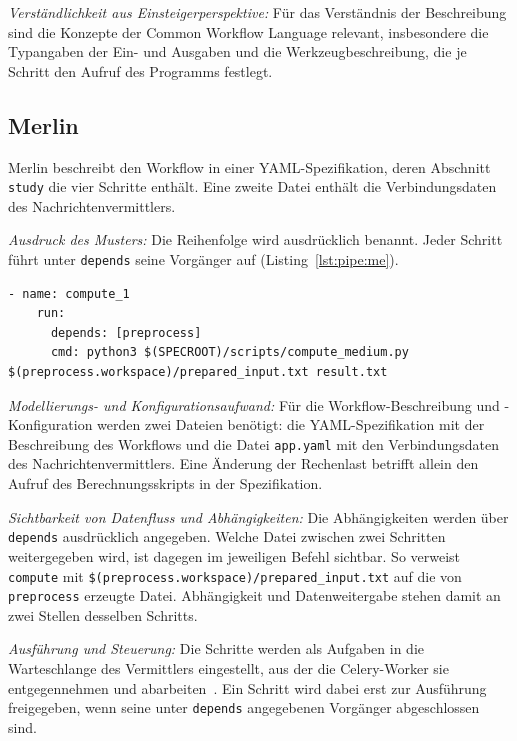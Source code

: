 \emph{Verständlichkeit aus Einsteigerperspektive:} Für das
Verständnis der Beschreibung sind die Konzepte der Common Workflow
Language relevant, insbesondere die Typangaben der Ein- und
Ausgaben und die Werkzeugbeschreibung, die je Schritt den Aufruf
des Programms festlegt.

\subsection{Merlin}
\label{sec:lokal:pipeline:merlin}

Merlin beschreibt den Workflow in einer YAML-Spezifikation, deren
Abschnitt \texttt{study} die vier Schritte enthält. Eine zweite Datei
enthält die Verbindungsdaten des Nachrichtenvermittlers.

\emph{Ausdruck des Musters:} Die Reihenfolge wird ausdrücklich
benannt. Jeder Schritt führt unter \texttt{depends} seine Vorgänger
auf (Listing~\ref{lst:pipe:me}).

\begin{lstlisting}[caption={Abhängigkeit und Datenweitergabe eines Schritts (Merlin, Pipeline)},label={lst:pipe:me}]
  - name: compute_1
    run:
      depends: [preprocess]
      cmd: python3 $(SPECROOT)/scripts/compute_medium.py $(preprocess.workspace)/prepared_input.txt result.txt
\end{lstlisting}

\emph{Modellierungs- und Konfigurationsaufwand:} Für die
Workflow-Beschreibung und -Konfiguration werden zwei Dateien
benötigt: die YAML-Spezifikation mit der Beschreibung des Workflows
und die Datei \texttt{app.yaml} mit den Verbindungsdaten des
Nachrichtenvermittlers. Eine Änderung der Rechenlast betrifft allein
den Aufruf des Berechnungsskripts in der Spezifikation.

\emph{Sichtbarkeit von Datenfluss und Abhängigkeiten:} Die
Abhängigkeiten werden über \texttt{depends} ausdrücklich angegeben.
Welche Datei zwischen zwei Schritten weitergegeben wird, ist dagegen
im jeweiligen Befehl sichtbar. So verweist \texttt{compute} mit
\texttt{\$(preprocess.workspace)/prepared\_input.txt} auf die von
\texttt{preprocess} erzeugte Datei. Abhängigkeit und Datenweitergabe
stehen damit an zwei Stellen desselben Schritts.

\emph{Ausführung und Steuerung:} Die Schritte werden als Aufgaben in
die Warteschlange des Vermittlers eingestellt, aus der die
Celery-Worker sie entgegennehmen und
abarbeiten~\cite[S.~258]{peterson2022merlin}\cite{merlindocs-celery}.
Ein Schritt wird dabei erst zur Ausführung freigegeben, wenn seine
unter \texttt{depends} angegebenen Vorgänger abgeschlossen sind.

